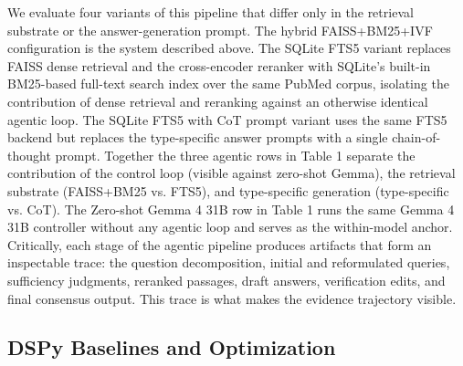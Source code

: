 \documentclass[sigconf,anonymous,review]{acmart}
\begin{document}
We evaluate four variants of this pipeline that differ only in the
retrieval substrate or the answer-generation prompt. The hybrid
FAISS+BM25+IVF configuration is the system described above.
The SQLite FTS5 variant replaces FAISS dense retrieval and the
cross-encoder reranker with SQLite's built-in BM25-based full-text search index over the same PubMed corpus, isolating the contribution of dense retrieval and reranking against an otherwise identical
agentic loop. The SQLite FTS5 with CoT prompt variant uses the
same FTS5 backend but replaces the type-specific answer prompts
with a single chain-of-thought prompt. Together the three agentic
rows in Table 1 separate the contribution of the control loop (visible against zero-shot Gemma), the retrieval substrate (FAISS+BM25
vs. FTS5), and type-specific generation (type-specific vs. CoT). The
Zero-shot Gemma 4 31B row in Table 1 runs the same Gemma 4
31B controller without any agentic loop and serves as the within-model anchor. Critically, each stage of the agentic pipeline produces
artifacts that form an inspectable trace: the question decomposition, initial and reformulated queries, sufficiency judgments, reranked passages, draft answers, verification edits, and final consensus output. This trace is what makes the evidence trajectory visible.

\subsection{DSPy Baselines and Optimization}
\end{document}
